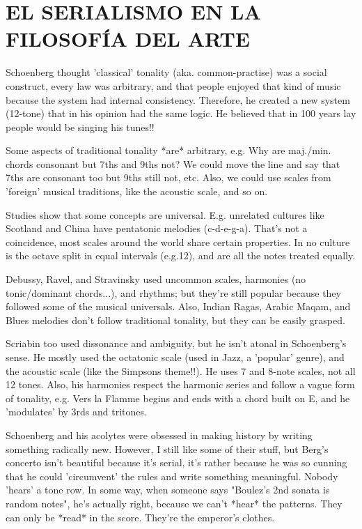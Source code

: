 	\chapter{EL SERIALISMO EN LA FILOSOFÍA DEL ARTE} %
        
    Schoenberg thought 'classical' tonality (aka. common-practise) was a social construct, every law was arbitrary, and that people enjoyed that kind of music because the system had internal consistency. Therefore, he created a new system (12-tone) that in his opinion had the same logic. He believed that in 100 years lay people would be singing his tunes!!
    
    Some aspects of traditional tonality *are* arbitrary, e.g. Why are maj./min. chords consonant but 7ths and 9ths not? We could move the line and say that 7ths are consonant too but 9ths still not, etc. Also, we could use scales from 'foreign' musical traditions, like the acoustic scale, and so on.
    
    Studies show that some concepts are universal. E.g. unrelated cultures like Scotland and China have pentatonic melodies (c-d-e-g-a). That's not a coincidence, most scales around the world share certain properties. In no culture is the octave split in equal intervals (e.g.12), and are all the notes treated equally.
    
    Debussy, Ravel, and Stravinsky used uncommon scales, harmonies (no tonic/dominant chords...), and rhythms; but they're still popular because they followed some of the musical universals. Also, Indian Ragas, Arabic Maqam, and Blues melodies don't follow traditional tonality, but they can be easily grasped.
    
    Scriabin too used dissonance and ambiguity, but he isn't atonal in Schoenberg's sense. He mostly used the octatonic scale (used in Jazz, a 'popular' genre), and the acoustic scale (like the Simpsons theme!!). He uses 7 and 8-note scales, not all 12 tones. Also, his harmonies respect the harmonic series and follow a vague form of tonality, e.g. Vers la Flamme begins and ends with a chord built on E, and he 'modulates' by 3rds and tritones.
    
    Schoenberg and his acolytes were obsessed in making history by writing something radically new. However, I still like some of their stuff, but Berg's concerto isn't beautiful because it's serial, it's rather because he was so cunning that he could 'circumvent' the rules and write something meaningful. Nobody 'hears' a tone row. In some way, when someone says "Boulez's 2nd sonata is random notes", he's actually right, because we can't *hear* the patterns. They can only be *read* in the score. They're the emperor's clothes.
    

